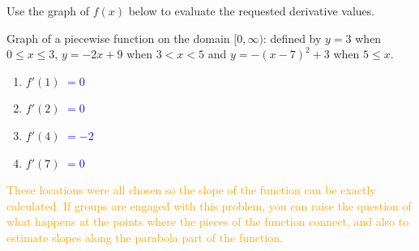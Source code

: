\documentclass{ximera}
\begin{document}
\begin{exercise}
    Use the graph of $f(x)$ below to evaluate the requested derivative values.
    \begin{image}
    \end{image}
    \xmalt Graph of a piecewise function on the domain $[0,\infty)$: defined by $y=3$ when $0\leq x\leq 3$, $y=-2x+9$ when $3<x<5$ and $y=-(x-7)^2+3$ when $5\leq x$.
    \begin{enumerate}
        \item $f'(1)$ \textcolor{blue}{$=0$}
        \item $f'(2)$ \textcolor{blue}{$=0$}
        \item $f'(4)$ \textcolor{blue}{$=-2$}
        \item $f'(7)$ \textcolor{blue}{$=0$}
    \end{enumerate}
    \textcolor{orange}{These locations were all chosen so the slope of the function can be exactly calculated.  If groups are engaged with this problem, you can raise the question of what happens at the points where the pieces of the function connect, and also to estimate slopes along the parabola part of the function.}
\end{exercise}
\end{document}
